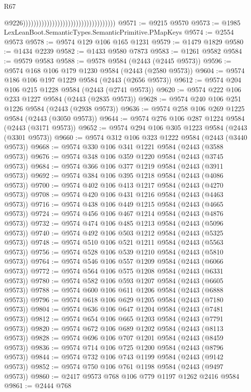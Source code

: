 \begin{lexlean}{R67}
\begin{coremodule}
                                                                          @9226)))))))))))))))))))))))))))))))))))
@9571 := @9215 @9570
@9573 := @1985 LexLeanBoot.SemanticTypes.SemanticPrimitive.PMapKeys
@9574 := @2554 @9573
@9578 := @9574 @129 @106 @165 @1231
@9579 := @1479 @1829
@9580 := @1434 @2239
@9582 := @1433 @9580 @7873
@9583 := @1261 @9582
@9584 := @9579 @9583
@9588 := @9578 @9584 (@2443 (@2445 @9573))
@9596 := @9574 @168 @106 @179 @1230 @9584 (@2443 (@2580 @9573))
@9604 := @9574 @186 @106 @197 @1229 @9584 (@2443 (@2656 @9573))
@9612 := @9574 @204 @106 @215 @1228 @9584 (@2443 (@2741 @9573))
@9620 := @9574 @222 @106 @233 @1227 @9584 (@2443 (@2835 @9573))
@9628 := @9574 @240 @106 @251 @1226 @9584 (@2443 (@2938 @9573))
@9636 := @9574 @258 @106 @269 @1225 @9584 (@2443 (@3050 @9573))
@9644 := @9574 @276 @106 @287 @1224 @9584 (@2443 (@3171 @9573))
@9652 := @9574 @294 @106 @305 @1223 @9584 (@2443 (@3301 @9573))
@9660 := @9574 @312 @106 @323 @1222 @9584 (@2443 (@3440 @9573))
@9668 := @9574 @330 @106 @341 @1221 @9584 (@2443 (@3588 @9573))
@9676 := @9574 @348 @106 @359 @1220 @9584 (@2443 (@3745 @9573))
@9684 := @9574 @366 @106 @377 @1219 @9584 (@2443 (@3911 @9573))
@9692 := @9574 @384 @106 @395 @1218 @9584 (@2443 (@4086 @9573))
@9700 := @9574 @402 @106 @413 @1217 @9584 (@2443 (@4270 @9573))
@9708 := @9574 @420 @106 @431 @1216 @9584 (@2443 (@4463 @9573))
@9716 := @9574 @438 @106 @449 @1215 @9584 (@2443 (@4665 @9573))
@9724 := @9574 @456 @106 @467 @1214 @9584 (@2443 (@4876 @9573))
@9732 := @9574 @474 @106 @485 @1213 @9584 (@2443 (@5096 @9573))
@9740 := @9574 @492 @106 @503 @1212 @9584 (@2443 (@5325 @9573))
@9748 := @9574 @510 @106 @521 @1211 @9584 (@2443 (@5563 @9573))
@9756 := @9574 @528 @106 @539 @1210 @9584 (@2443 (@5810 @9573))
@9764 := @9574 @546 @106 @557 @1209 @9584 (@2443 (@6066 @9573))
@9772 := @9574 @564 @106 @575 @1208 @9584 (@2443 (@6331 @9573))
@9780 := @9574 @582 @106 @593 @1207 @9584 (@2443 (@6605 @9573))
@9788 := @9574 @600 @106 @611 @1206 @9584 (@2443 (@6888 @9573))
@9796 := @9574 @618 @106 @629 @1205 @9584 (@2443 (@7180 @9573))
@9804 := @9574 @636 @106 @647 @1204 @9584 (@2443 (@7481 @9573))
@9812 := @9574 @654 @106 @665 @1203 @9584 (@2443 (@7791 @9573))
@9820 := @9574 @672 @106 @689 @1202 @9584 (@2443 (@8113 @9573))
@9828 := @9574 @696 @106 @707 @1201 @9584 (@2443 (@8459 @9573))
@9836 := @9574 @714 @106 @725 @1200 @9584 (@2443 (@8796 @9573))
@9844 := @9574 @732 @106 @743 @1199 @9584 (@2443 (@9142 @9573))
@9852 := @9574 @750 @106 @761 @1198 @9584 (@2443 (@9497 @9573))
@9860 := @2417 @9573 @768 @106 @779 @1197 @1262 @2416 @9584
@9861 := @2444 @768

\end{coremodule}
\end{lexlean}
